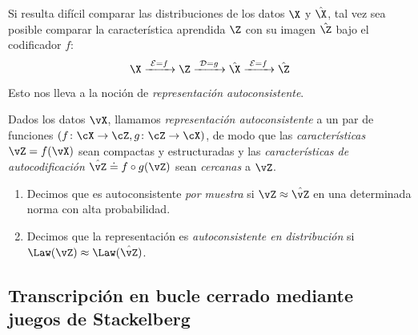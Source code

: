\documentclass[../../book-main_es.tex]{subfiles}
\begin{document}
Si resulta difícil comparar las distribuciones de los datos $\X$ y
$\hat \X$, tal vez sea posible comparar la característica aprendida $\Z$
con su imagen $\hat \Z$ bajo el codificador $f$:
\begin{equation}
    \X
    \xrightarrow{\hspace{1mm} \mathcal{E} = f \hspace{1mm}} \Z
    \xrightarrow{\hspace{1mm} \mathcal{D} = g \hspace{1mm}} \hat{\X}
    \xrightarrow{\hspace{1mm} \mathcal{E} = f \hspace{1mm}} \hat \Z
    \label{eqn:closed-autoencoding}
\end{equation}
Esto nos lleva a la noción de {\em representación autoconsistente}.
\begin{definition}\label{def:closed_loop}
    Dados los datos \(\vX\), llamamos \textit{representación autoconsistente} 
    a un par de funciones \((f \colon \cX \to \cZ, g \colon \cZ \to \cX)\), 
    de modo que las \textit{características} \(\vZ = f(\vX)\) sean 
    compactas y estructuradas y las \textit{características de autocodificación}
    \(\hat{\vZ} \doteq f \circ g(\vZ)\) sean \textit{cercanas} a \(\vZ\).
    \begin{enumerate}
        \item Decimos que es autoconsistente \textit{por muestra}
            si \(\vZ \approx \hat{\vZ}\) en una determinada norma con alta
            probabilidad.
        \item Decimos que la representación es
            \textit{autoconsistente en distribución} si \(\Law(\vZ)
            \approx \Law(\hat{\vZ})\).
    \end{enumerate}
\end{definition}

\subsection{Transcripción en bucle cerrado mediante juegos de 
Stackelberg}\label{sec:closed-loop-transcription}
\end{document}
